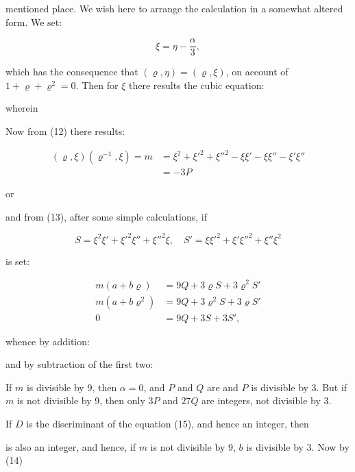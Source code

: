 mentioned place. We wish here to arrange the calculation in a somewhat
altered form. We set:

\[ \xi = \eta - \frac{\alpha}{3}, \]

which has the consequence that $(\varrho, \eta) = (\varrho, \xi)$, on account of
$1 + \varrho + \varrho^2 = 0$. Then for $\xi$ there results the cubic
equation:


wherein


Now from (12) there results:

\[ \begin{aligned}
(\varrho, \xi)(\varrho^{-1}, \xi) = m &= \xi^2 + \xi'^2 + \xi''^2 - \xi\xi' - \xi\xi'' - \xi'\xi'' \\
&= -3P
\end{aligned} \]

or


and from (13), after some simple calculations, if

\[ S = \xi^2\xi' + \xi'^2\xi'' + \xi''^2\xi, \quad S' = \xi\xi'^2 + \xi'\xi''^2 + \xi''\xi^2 \]

is set:

\[ \begin{aligned}
m(a + b\varrho) &= 9Q + 3\varrho S + 3\varrho^2 S' \\
m(a + b\varrho^2) &= 9Q + 3\varrho^2 S + 3\varrho S' \\
0 &= 9Q + 3S + 3S',
\end{aligned} \]

whence by addition:


and by subtraction of the first two:


If $m$ is divisible by 9, then $\alpha = 0$, and $P$ and $Q$ are
 and $P$ is divisible by 3. But if $m$ is not divisible by 9,
then only $3P$ and $27Q$ are integers, not divisible by 3.

If $D$ is the discriminant of the equation (15), and hence an integer, then


is also an integer, and hence, if $m$ is not divisible by 9, $b$ is
divisible by 3. Now by (14)
